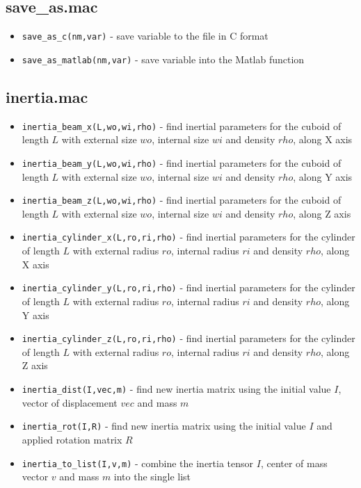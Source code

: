 \documentclass{article}
\begin{document}
\subsection{save\_as.mac}

\begin{itemize}
    \item \texttt{save\_as\_c(nm,var)} - save variable to the file in C format 
    \item \texttt{save\_as\_matlab(nm,var)} - save variable into the Matlab function 
\end{itemize}

\subsection{inertia.mac} 

\begin{itemize}
    \item \texttt{inertia\_beam\_x(L,wo,wi,rho)} - find inertial parameters for the cuboid of length $L$ with external size $wo$, internal size $wi$ and density $rho$, along X axis
    \item \texttt{inertia\_beam\_y(L,wo,wi,rho)} - find inertial parameters for the cuboid of length $L$ with external size $wo$, internal size $wi$ and density $rho$, along Y axis
    \item \texttt{inertia\_beam\_z(L,wo,wi,rho)} - find inertial parameters for the cuboid of length $L$ with external size $wo$, internal size $wi$ and density $rho$, along Z axis
    \item \texttt{inertia\_cylinder\_x(L,ro,ri,rho)} - find inertial parameters for the cylinder of length $L$ with external radius $ro$, internal radius $ri$ and density $rho$, along X axis
    \item \texttt{inertia\_cylinder\_y(L,ro,ri,rho)} - find inertial parameters for the cylinder of length $L$ with external radius $ro$, internal radius $ri$ and density $rho$, along Y axis
    \item \texttt{inertia\_cylinder\_z(L,ro,ri,rho)} - find inertial parameters for the cylinder of length $L$ with external radius $ro$, internal radius $ri$ and density $rho$, along Z axis
    \item \texttt{inertia\_dist(I,vec,m)} - find new inertia matrix using the initial value $I$, vector of displacement $vec$ and mass $m$ 
    \item \texttt{inertia\_rot(I,R)} - find new inertia matrix using the initial value $I$ and applied rotation matrix $R$
    \item \texttt{inertia\_to\_list(I,v,m)} - combine the inertia tensor $I$, center of mass vector $v$ and mass $m$ into the single list
\end{itemize}
\end{document}

